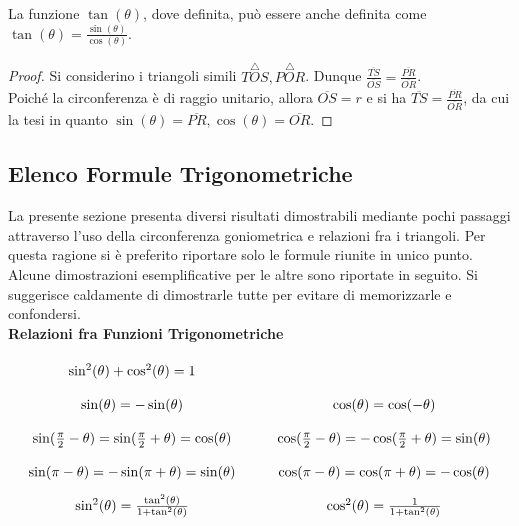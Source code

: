 \begin{proposition}\label{prop:tan}
	La funzione $\tan(\theta)$, dove definita, può essere anche definita come $\tan(\theta) = \frac{\sin(\theta)}{\cos(\theta)}$.
	\begin{proof}
		Si considerino i triangoli simili $\overset{\triangle}{TOS}, \overset{\triangle}{POR}$.
		Dunque $ \frac{\overline{TS}}{\overline{OS}} = \frac{\overline{PR}}{\overline{OR}} $.\\
		Poiché la circonferenza è di raggio unitario, allora $\overline{OS}=r$ e si ha $ \overline{TS} = \frac{\overline{PR}}{\overline{OR}} $,
		da cui la tesi in quanto $ \sin(\theta) = \overline{PR}, \cos(\theta) = \overline{OR}$.
	\end{proof}
\end{proposition}


\subsection{Elenco Formule Trigonometriche}\label{sect:elenco_formule_trigo}
La presente sezione presenta diversi risultati dimostrabili mediante pochi passaggi attraverso l'uso della circonferenza goniometrica e relazioni fra i triangoli.
Per questa ragione si è preferito riportare solo le formule riunite in unico punto.
Alcune dimostrazioni esemplificative per le altre sono riportate in seguito.
Si suggerisce caldamente di dimostrarle tutte per evitare di memorizzarle e confondersi.\\

\textbf{Relazioni fra Funzioni Trigonometriche}
\[\arraycolsep=5pt\def\arraystretch{2}
	\begin{array}{ccc}
		\sin^2(\theta) + \cos^2(\theta) = 1\\
		\sin(\theta) = -\sin(\theta) & \quad & \cos(\theta) = \cos(-\theta)\\
		\sin(\frac{\pi}{2} - \theta) = \sin(\frac{\pi}{2} + \theta) = \cos(\theta) & \quad &
		\cos(\frac{\pi}{2} - \theta) = -\cos(\frac{\pi}{2} + \theta) = \sin(\theta)\\
		\sin(\pi - \theta) = -\sin(\pi + \theta) = \sin(\theta) & \quad & \cos(\pi - \theta) = \cos(\pi + \theta) = -\cos(\theta)\\
		\sin^2(\theta) = \frac{\tan^2(\theta)}{1 + \tan^2(\theta)} & \quad & \cos^2(\theta) = \frac{1}{1 + \tan^2(\theta)}\\
	\end{array}
\]

